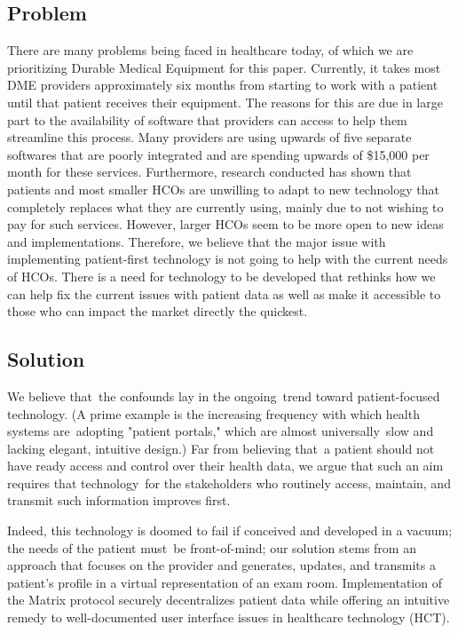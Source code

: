 \documentclass[preprint,pre,floats,aps,amsmath,amssymb]{revtex4-1}
\begin{document}
\subsection{Problem}
There are many problems being faced in healthcare today, of which we are prioritizing Durable Medical Equipment for this paper. Currently, it takes most DME providers approximately six months from starting to work with a patient until that patient receives their equipment. The reasons for this are due in large part to the availability of software that providers can access to help them streamline this process. Many providers are using upwards of five separate softwares that are poorly integrated and are spending upwards of \$15,000 per month for these services. Furthermore, research conducted has shown that patients and most smaller HCOs are unwilling to adapt to new technology that completely replaces what they are currently using, mainly due to not wishing to pay for such services. However, larger HCOs seem to be more open to new ideas and implementations. Therefore, we believe that the major issue with implementing patient-first technology is not going to help with the current needs of HCOs. There is a need for technology to be developed that rethinks how we can help fix the current issues with patient data as well as make it accessible to those who can impact the market directly the quickest.

\subsection{Solution}
We believe that the confounds lay in the ongoing trend toward patient-focused technology. (A prime example is the increasing frequency with which health systems are adopting "patient portals," which are almost universally slow and lacking elegant, intuitive design.) Far from believing that a patient should not have ready access and control over their health data, we argue that such an aim requires that technology for the stakeholders who routinely access, maintain, and transmit such information improves first.

Indeed, this technology is doomed to fail if conceived and developed in a vacuum; the needs of the patient must be front-of-mind; our solution stems from an approach that focuses on the provider and generates, updates, and transmits a patient's profile in a virtual representation of an exam room. Implementation of the Matrix protocol securely decentralizes patient data while offering an intuitive remedy to well-documented user interface issues in healthcare technology (HCT).
\end{document}
